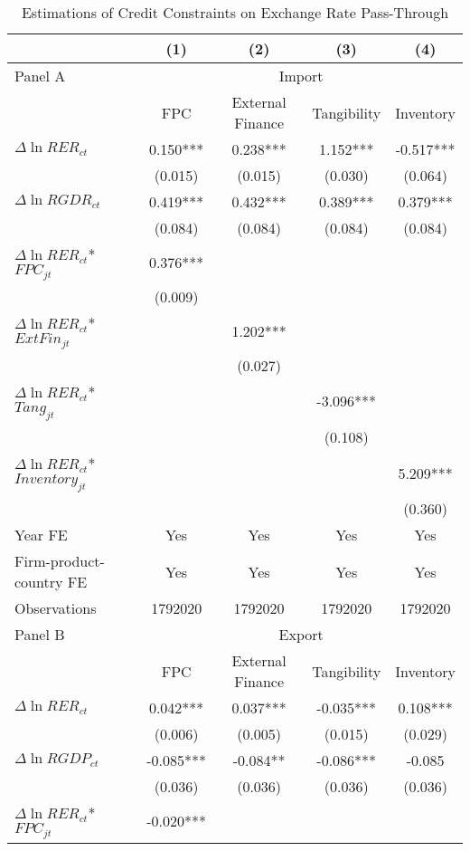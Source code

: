 \begin{table}[htbp]
	\centering
	\caption{Estimations of Credit Constraints on Exchange Rate Pass-Through}
	\begin{threeparttable}	
	\begin{tabular}{lcccc}
		\toprule
		& (1)   & (2)   & (3)   & (4) \\
		\midrule
		Panel A & \multicolumn{4}{c}{Import} \\
		& FPC   & External Finance & Tangibility & Inventory \\
		\midrule
		$\Delta \ln RER_{ct}$ & 0.150*** & 0.238*** & 1.152*** & -0.517*** \\
		& (0.015) & (0.015) & (0.030) & (0.064) \\
		$\Delta \ln RGDR_{ct}$ & 0.419*** & 0.432*** & 0.389*** & 0.379*** \\
		& (0.084) & (0.084) & (0.084) & (0.084) \\
		$\Delta \ln RER_{ct}$*$FPC_{jt}$ & 0.376*** &       &       &  \\
		& (0.009) &       &       &  \\
		$\Delta \ln RER_{ct}$*$ExtFin_{jt}$ &       & 1.202*** &       &  \\
		&       & (0.027) &       &  \\
		$\Delta \ln RER_{ct}$*$Tang_{jt}$ &       &       & -3.096*** &  \\
		&       &       & (0.108) &  \\
		$\Delta \ln RER_{ct}$*$Inventory_{jt}$ &       &       &       & 5.209*** \\
		&       &       &       & (0.360) \\
		Year FE  & Yes   & Yes   & Yes   & Yes \\
		Firm-product-country FE & Yes   & Yes   & Yes   & Yes \\
		Observations & 1792020 & 1792020 & 1792020 & 1792020 \\
		\midrule
		Panel B & \multicolumn{4}{c}{Export} \\
		& FPC   & External Finance & Tangibility & Inventory \\
		\midrule
		$\Delta \ln RER_{ct}$ & 0.042*** & 0.037*** & -0.035*** & 0.108*** \\
		& (0.006) & (0.005) & (0.015) & (0.029) \\
		$\Delta \ln RGDP_{ct}$ & -0.085*** & -0.084** & -0.086*** & -0.085 \\
		& (0.036) & (0.036) & (0.036) & (0.036) \\
		$\Delta \ln RER_{ct}$*$FPC_{jt}$ & -0.020*** &       &       &  \\

\end{tabular}
\end{threeparttable}
\end{table}
